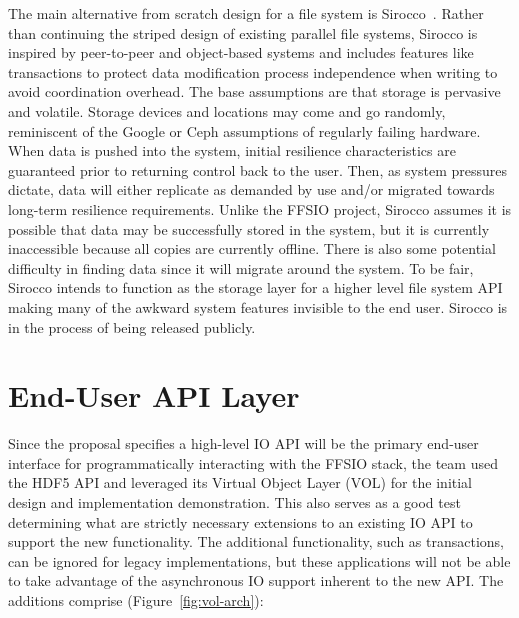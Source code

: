 \documentclass[conference]{IEEEtran} \pdfpagewidth=8.5in
\begin{document}
The main alternative from scratch design for a file system is
Sirocco~\cite{sirocco}. Rather than continuing the striped design of existing
parallel file systems, Sirocco is inspired by peer-to-peer and object-based
systems and includes features like transactions to protect data modification
process independence when writing to avoid coordination overhead.  The base
assumptions are that storage is pervasive and volatile. Storage devices and
locations may come and go randomly, reminiscent of the Google or Ceph
assumptions of regularly failing hardware. When data is pushed into the system,
initial resilience characteristics are guaranteed prior to returning control
back to the user. Then, as system pressures dictate, data will either replicate
as demanded by use and/or migrated towards long-term resilience requirements.
Unlike the FFSIO project, Sirocco assumes it is possible that data may be
successfully stored in the system, but it is currently inaccessible because all
copies are currently offline. There is also some potential difficulty in
finding data since it will migrate around the system. To be fair, Sirocco
intends to function as the storage layer for a higher level file system API
making many of the awkward system features invisible to the end user. Sirocco
is in the process of being released publicly.

\section{End-User API Layer}
\label{sec:end-user}

Since the proposal specifies a high-level IO API will be the primary end-user
interface for programmatically interacting with the FFSIO stack, the team used
the HDF5 API and leveraged its Virtual Object Layer (VOL) for the initial
design and implementation demonstration. This also serves as a good test
determining what are strictly necessary extensions to an existing IO API to
support the new functionality.  The additional functionality, such as
transactions, can be ignored for legacy implementations, but these applications
will not be able to take advantage of the asynchronous IO support inherent to
the new API.  The additions comprise (Figure~\ref{fig:vol-arch}):
\end{document}
